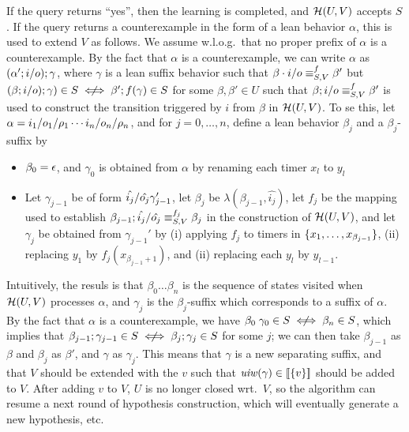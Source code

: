 If the query returns ``yes'', then
the learning is completed, and $\mathcal{H}(U,V)$ accepts $S$.
If the query returns a counterexample in the form of a lean behavior
$\alpha$, this is used to extend $V$ as follows.
We assume w.l.o.g.\ that no proper prefix of $\alpha$ is a counterexample. 
By the fact that $\alpha$ is a counterexample, we can write $\alpha$ as
$(\alpha';i/o); \gamma$, where $\gamma$ is a lean suffix
behavior such that
$\beta\cdot i/o \equiv_{S,V}^f \beta'$ but
$(\beta ; \simpleutlabel{i}{o}) ; \gamma) \in S \notiff \beta' ; f(\gamma) \in S$ for some $\beta,\beta' \in U$ such that 
$\beta;i/o \equiv_{S,V}^f \beta'$ is used to construct
the transition triggered by $i$ from $\beta$ in $\mathcal{H}(U,V)$.
To se this, let $\alpha = i_1/o_1/\rho_1 \cdots i_n/o_n/\rho_n$, and for $j = 0 , \ldots, n$, define
a lean behavior $\beta_j$ and a $\beta_j$-suffix by
\begin{itemize}
\item $\beta_0 = \epsilon$, and
  $\gamma_0$ is obtained from $\alpha$ by renaming each timer $x_l$ to $y_l$
\item
  Let $\gamma_{j-1}$ be of form
  $\hat{i_j}/\hat{o_j} \gamma_{j-1}'$,
  let $\beta_j$ be $\lambda(\beta_{j-1},\hat{i_j})$,
  let $f_j$ be the mapping used to establish
  $\beta_{j-1};\hat{i_j}/\hat{o_j} \equiv_{S,V}^{f_j} \beta_{j}$
  in the construction of $\mathcal{H}(U,V)$,
  and let $\gamma_j$ be obtained from $\gamma_{j-1}'$ by
  (i) applying $f_j$ to timers in $\lbrace x_1, \ldots , x_{\beta_{j-1}}\rbrace$,
  (ii) replacing $y_1$ by $f_j(x_{\beta_{j-1}+1})$, and
  (ii) replacing each $y_l$ by $y_{l-1}$.
\end{itemize}
Intuitively, the resuls is that
$\beta_0 \ldots \beta_n$ is the sequence of states 
visited when $\mathcal{H}(U,V)$ processes $\alpha$, and
$\gamma_j$ is the $\beta_j$-suffix which corresponds to a suffix of $\alpha$.
By the fact that $\alpha$ is a counterexample, we have
$\beta_0\;\gamma_0 \in S \notiff  \beta_{n} \in S$, which implies that
$\beta_{j-1};\gamma_{j-1} \in S \notiff \beta_j;\gamma_j \in S$
for some $j$;
we can then take $\beta_{j-1}$ as $\beta$ and $\beta_j$ as $\beta'$, and
$\gamma$ as $\gamma_j$.
This means that $\gamma$ is a new separating suffix, and that $V$ should be
extended with the $v$ such that
$\mathit{uiw}(\gamma) \in [\![ \lbrace v\rbrace ] \! ]$
should be added to
$V$. After adding $v$ to $V$, $U$ is no longer closed
wrt.\ $V$, so the algorithm can resume a next round of
hypothesis construction, which will eventually generate a new hypothesis, etc.

